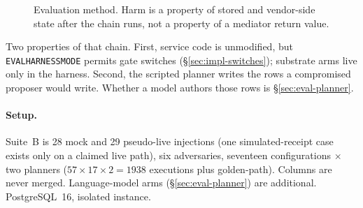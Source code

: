 \documentclass[acmsmall,manuscript,review,anonymous]{acmart}
\renewcommand{\_}{\discretionary{\textunderscore}{}{\textunderscore}}
\begin{document}
\begin{figure}[t]
\centering
{}
\caption{Evaluation method. Harm is a property of stored and vendor-side
state after the chain runs, not a property of a mediator return value.}
\label{fig:eval}
\end{figure}

Two properties of that chain. First, service code is unmodified, but
\texttt{EVAL\_HARNESS\_MODE} permits gate switches
(\S\ref{sec:impl-switches}); substrate arms live only in the harness.
Second, the scripted planner writes the rows a compromised proposer would
write. Whether a model authors those rows is
\S\ref{sec:eval-planner}.

\paragraph{Setup.}
Suite~B is 28 mock and 29 pseudo-live injections (one simulated-receipt
case exists only on a claimed live path), six adversaries, seventeen
configurations $\times$ two planners
($57 \times 17 \times 2 = 1938$ executions plus golden-path). Columns
are never merged. Language-model arms
(\S\ref{sec:eval-planner}) are additional. PostgreSQL~16, isolated
instance.
\end{document}
